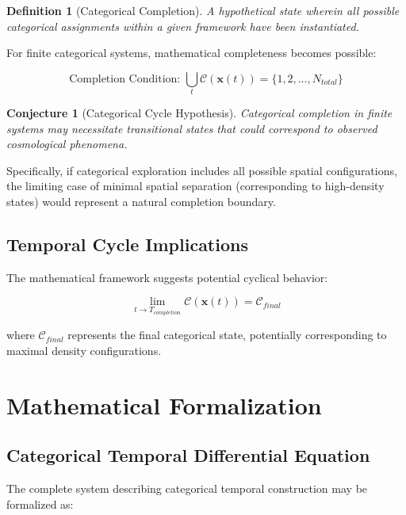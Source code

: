 \documentclass[12pt,a4paper]{article}
\newtheorem{definition}[theorem]{Definition}
\newtheorem{conjecture}[theorem]{Conjecture}
\theoremstyle{remark}
\begin{document}
\begin{definition}[Categorical Completion]
A hypothetical state wherein all possible categorical assignments within a given framework have been instantiated.
\end{definition}

For finite categorical systems, mathematical completeness becomes possible:

\begin{equation}
\text{Completion Condition: } \bigcup_{t} \mathcal{C}(\mathbf{x}(t)) = \{1, 2, \ldots, N_{total}\}
\end{equation}

\begin{conjecture}[Categorical Cycle Hypothesis]
Categorical completion in finite systems may necessitate transitional states that could correspond to observed cosmological phenomena.
\end{conjecture}

Specifically, if categorical exploration includes all possible spatial configurations, the limiting case of minimal spatial separation (corresponding to high-density states) would represent a natural completion boundary.

\subsection{Temporal Cycle Implications}

The mathematical framework suggests potential cyclical behavior:

\begin{equation}
\lim_{t \to T_{completion}} \mathcal{C}(\mathbf{x}(t)) = \mathcal{C}_{final}
\end{equation}

where $\mathcal{C}_{final}$ represents the final categorical state, potentially corresponding to maximal density configurations.

\section{Mathematical Formalization}

\subsection{Categorical Temporal Differential Equation}

The complete system describing categorical temporal construction may be formalized as:
\end{document}
